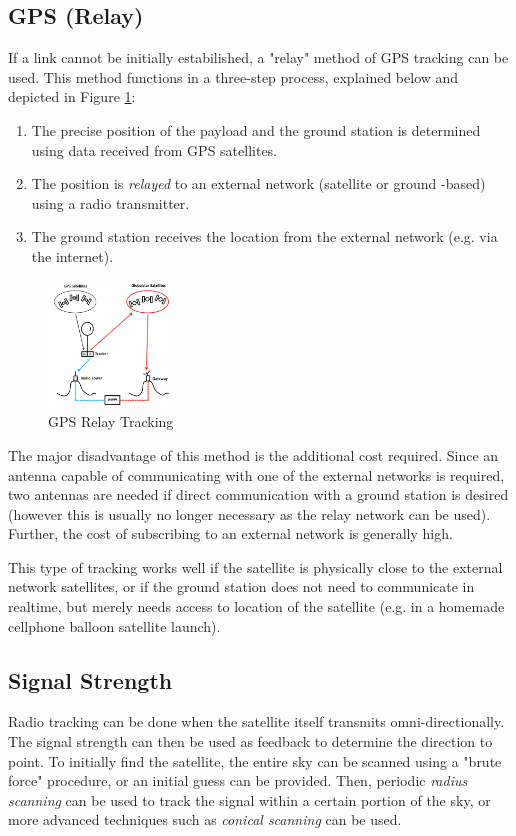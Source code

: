 \subsection{GPS (Relay)}
If a link cannot be initially estabilished, a "relay" method of GPS tracking can be used. This method functions in a three-step process, explained below and depicted in Figure \ref{fig:gps_relay}:
\begin{enumerate}
    \item The precise position of the payload and the ground station is determined using data received from GPS satellites.
    \item The position is \textit{relayed} to an external network (satellite or ground -based) using a radio transmitter.
    \item The ground station receives the location from the external network (e.g. via the internet).
\end{enumerate}

\begin{figure}[!htb]
  \centering
  \includegraphics[width=0.3\textwidth]{gps_relay}
  \caption{GPS Relay Tracking \cite{site-highaltitudescienceTrackingWeather}}
  \label{fig:gps_relay}
\end{figure}

The major disadvantage of this method is the additional cost required. Since an antenna capable of communicating with one of the external networks is required, two antennas are needed if direct communication with a ground station is desired (however this is usually no longer necessary as the relay network can be used). Further, the cost of subscribing to an external network is generally high.

This type of tracking works well if the satellite is physically close to the external network satellites, or if the ground station does not need to communicate in realtime, but merely needs access to location of the satellite (e.g. in a homemade cellphone balloon satellite launch).

\subsection{Signal Strength}
Radio tracking can be done when the satellite itself transmits omni-directionally. The signal strength can then be used as feedback to determine the direction to point. To initially find the satellite, the entire sky can be scanned using a "brute force" procedure, or an initial guess can be provided. Then, periodic \textit{radius scanning} can be used to track the signal within a certain portion of the sky, or more advanced techniques such as \textit{conical scanning} can be used.
